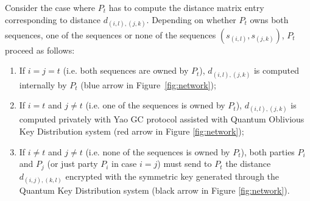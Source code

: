 Consider the case where $P_t$ has to compute the distance matrix entry corresponding to distance $d_{(i,l), (j, k)}$. Depending on whether $P_t$ owns both sequences, one of the sequences or none of the sequences $(s_{(i,l)}, s_{(j,k)})$, $P_t$ proceed as follows:

\begin{enumerate}
    \item If $i=j=t$ (i.e. both sequences are owned by $P_t$), $d_{(i,l),(j,k)}$ is computed internally by $P_t$ (blue arrow in Figure~\ref{fig:network});
    \item If $i=t$ and $j\neq t$ (i.e. one of the sequences is owned by $P_t$), $d_{(i,l),(j,k)}$ is computed privately with Yao GC protocol assisted with Quantum Oblivious Key Distribution system (red arrow in Figure \ref{fig:network});
    \item If $i\neq t$ and $j\neq t$ (i.e. none of the sequences is owned by $P_t$), both parties $P_i$ and $P_j$ (or just party $P_i$ in case $i=j$) must send to $P_t$ the distance $d_{(i,j),(k,l)}$ encrypted with the symmetric key generated through the Quantum Key Distribution system (black arrow in Figure \ref{fig:network}).
\end{enumerate}


%
%
%
